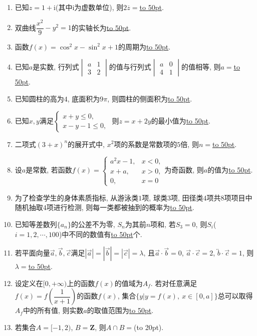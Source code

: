 \documentclass[10pt,a4paper]{article}
\newcommand{\blank}[1]{\underline{\hbox to #1pt{}}}
\newcommand{\bracket}[1]{(\hbox to #1pt{})}
\begin{document}
\begin{enumerate}[1.]
\item 已知$z=1+\mathrm{i}$(其中$\mathrm{i}$为虚数单位), 则$2\overline{z}=$\blank{50}.
\item 双曲线$\dfrac{x^2}{9}-y^2=1$的实轴长为\blank{50}.
\item 函数$f(x)=\cos^2 x-\sin ^2 x+1$的周期为\blank{50}.
\item 已知$a$是实数, 行列式$\begin{vmatrix}    a & 1 \\ 3 & 2\end{vmatrix}$的值与行列式$\begin{vmatrix}    a & 0 \\ 4 & 1\end{vmatrix}$的值相等, 则$a=$\blank{50}.
\item 已知圆柱的高为$4$, 底面积为$9\pi$, 则圆柱的侧面积为\blank{50}.
\item 已知$x,y$满足$\begin{cases}x+y\le 0, \\ x-y-1\le 0,\end{cases}$ 则$z=x+2y$的最小值为\blank{50}.
\item 二项式$(3+x)^n$的展开式中, $x^2$项的系数是常数项的$5$倍, 则$n=$\blank{50}.
\item 设$a$是常数, 若函数$f(x)=\begin{cases} a^2x-1, & x<0, \\ x+a, & x>0, \\ 0, & x=0 \end{cases}$为奇函数, 则$a$的值为\blank{50}.
\item 为了检查学生的身体素质指标, 从游泳类$1$项, 球类$3$项, 田径类$4$项共$8$项项目中随机抽取$4$项进行检测, 则每一类都被抽到的概率为\blank{50}.
\item 已知等差数列$\{a_n\}$的公差不为零, $S_n$为其前$n$项和, 若$S_3=0$, 则$S_i$($i=1,2,\cdots,100$)中不同的数值有\blank{50}个.
\item 若平面向量$\overrightarrow a,\overrightarrow b,\overrightarrow c$满足$|\overrightarrow a|=|\overrightarrow b|=|\overrightarrow c|=\lambda$, 且$\overrightarrow a\cdot \overrightarrow b=0$, $\overrightarrow a\cdot \overrightarrow c=2$, $\overleftrightarrow b\cdot \overrightarrow c=1$, 则$\lambda=$\blank{50}.
\item 设定义在$[0,+\infty)$上的函数$f(x)$的值域为$A_f$. 若对任意满足$f(x)=f(\dfrac 1{x+1})$的函数$f(x)$, 集合$\{y|y=f(x), \ x\in [0,a]\}$总可以取得$A_f$中的所有值, 则实数$a$的取值范围为\blank{50}.
\item 若集合$A=[-1,2)$, $B=\mathbf{Z}$, 则$A\cap B=$\bracket{20}.

\end{enumerate}
\end{document}
